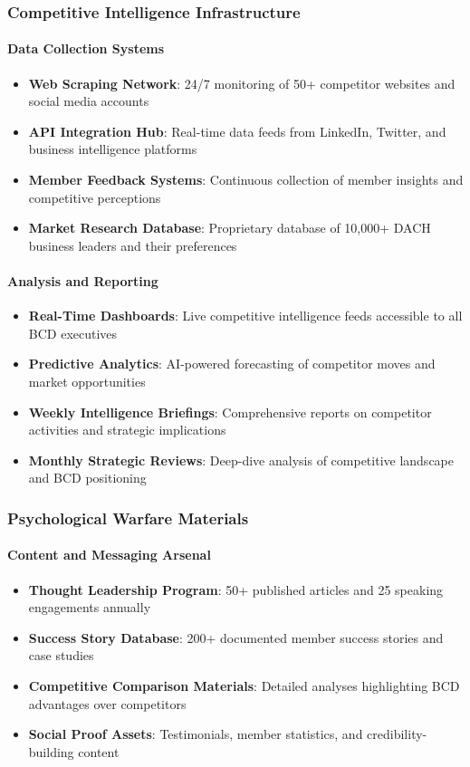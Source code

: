 \subsubsection{Competitive Intelligence Infrastructure}

\paragraph{Data Collection Systems}
\begin{itemize}
    \item \textbf{Web Scraping Network}: 24/7 monitoring of 50+ competitor websites and social media accounts
    \item \textbf{API Integration Hub}: Real-time data feeds from LinkedIn, Twitter, and business intelligence platforms
    \item \textbf{Member Feedback Systems}: Continuous collection of member insights and competitive perceptions
    \item \textbf{Market Research Database}: Proprietary database of 10,000+ DACH business leaders and their preferences
\end{itemize}

\paragraph{Analysis and Reporting}
\begin{itemize}
    \item \textbf{Real-Time Dashboards}: Live competitive intelligence feeds accessible to all BCD executives
    \item \textbf{Predictive Analytics}: AI-powered forecasting of competitor moves and market opportunities
    \item \textbf{Weekly Intelligence Briefings}: Comprehensive reports on competitor activities and strategic implications
    \item \textbf{Monthly Strategic Reviews}: Deep-dive analysis of competitive landscape and BCD positioning
\end{itemize}

\subsubsection{Psychological Warfare Materials}

\paragraph{Content and Messaging Arsenal}
\begin{itemize}
    \item \textbf{Thought Leadership Program}: 50+ published articles and 25 speaking engagements annually
    \item \textbf{Success Story Database}: 200+ documented member success stories and case studies
    \item \textbf{Competitive Comparison Materials}: Detailed analyses highlighting BCD advantages over competitors
    \item \textbf{Social Proof Assets}: Testimonials, member statistics, and credibility-building content
\end{itemize}

